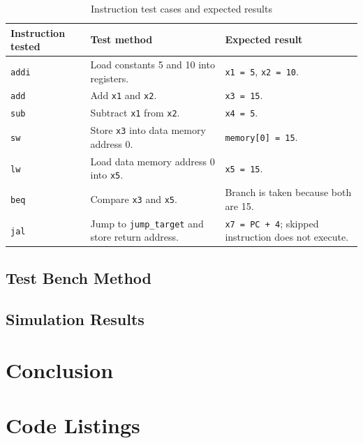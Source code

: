 \documentclass[12pt,a4paper]{article}
\begin{document}
\begin{table}[h!]
\centering
\caption{Instruction test cases and expected results}
\label{tab:instruction-tests}
\renewcommand{\arraystretch}{1.25}
\begin{tabularx}{\textwidth}{llX}
\toprule
\textbf{Instruction tested} & \textbf{Test method} & \textbf{Expected result} \\
\midrule
\texttt{addi} & Load constants 5 and 10 into registers. 
& \texttt{x1 = 5}, \texttt{x2 = 10}. \\

\texttt{add} & Add \texttt{x1} and \texttt{x2}. 
& \texttt{x3 = 15}. \\

\texttt{sub} & Subtract \texttt{x1} from \texttt{x2}. 
& \texttt{x4 = 5}. \\

\texttt{sw} & Store \texttt{x3} into data memory address 0. 
& \texttt{memory[0] = 15}. \\

\texttt{lw} & Load data memory address 0 into \texttt{x5}. 
& \texttt{x5 = 15}. \\

\texttt{beq} & Compare \texttt{x3} and \texttt{x5}. 
& Branch is taken because both are 15. \\

\texttt{jal} & Jump to \texttt{jump\_target} and store return address. 
& \texttt{x7 = PC + 4}; skipped instruction does not execute. \\
\bottomrule
\end{tabularx}
\end{table}

\subsection{Test Bench Method}

\subsection{Simulation Results}

\section{Conclusion}

\section{Code Listings}
\end{document}
